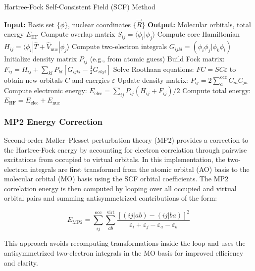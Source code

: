 \documentclass[12pt]{article}
\begin{document}
\begin{algorithm}[H]
\caption{Hartree-Fock Self-Consistent Field (SCF) Method}
\begin{algorithmic}[1]
\Statex \textbf{Input:} Basis set $\{\phi\}$, nuclear coordinates $\{\vec{R}\}$
\Statex \textbf{Output:} Molecular orbitals, total energy $E_{\text{HF}}$
\State Compute overlap matrix $S_{ij} = \langle \phi_i | \phi_j \rangle$
\State Compute core Hamiltonian $H_{ij} = \langle \phi_i | \hat{T} + \hat{V}_{\text{nuc}} | \phi_j \rangle$
\State Compute two-electron integrals $G_{ijkl} = (\phi_i\phi_j|\phi_k\phi_l)$
\State Initialize density matrix $P_{ij}$ (e.g., from atomic guess)
\Repeat
    \State Build Fock matrix: $F_{ij} = H_{ij} + \sum_{kl} P_{kl} \left[ G_{ijkl} - \frac{1}{2} G_{ikjl} \right]$
    \State Solve Roothaan equations: $FC = SC\varepsilon$ to obtain new orbitals $C$ and energies $\varepsilon$
    \State Update density matrix: $P_{ij} = 2 \sum_{a}^{\text{occ}} C_{ia} C_{ja}$
    \State Compute electronic energy: $E_{\text{elec}} = \sum_{ij} P_{ij} (H_{ij} + F_{ij})/2$
\State Compute total energy: $E_{\text{HF}} = E_{\text{elec}} + E_{\text{nuc}}$
\end{algorithmic}
\end{algorithm}

\subsubsection*{MP2 Energy Correction}

Second-order Møller–Plesset perturbation theory (MP2) provides a correction to the Hartree-Fock energy by accounting for electron correlation through pairwise excitations from occupied to virtual orbitals. In this implementation, the two-electron integrals are first transformed from the atomic orbital (AO) basis to the molecular orbital (MO) basis using the SCF orbital coefficients. The MP2 correlation energy is then computed by looping over all occupied and virtual orbital pairs and summing antisymmetrized contributions of the form:

\[
E_{\text{MP2}} = \sum_{ij}^{\text{occ}} \sum_{ab}^{\text{virt}} 
\frac{\left[(ij|ab) - (ij|ba)\right]^2}{\varepsilon_i + \varepsilon_j - \varepsilon_a - \varepsilon_b}
\]

This approach avoids recomputing transformations inside the loop and uses the antisymmetrized two-electron integrals in the MO basis for improved efficiency and clarity.
\end{document}
